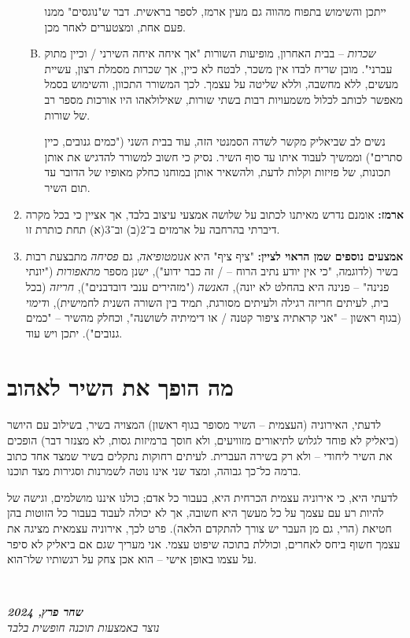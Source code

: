 \documentclass[]{article}
\newcommand\ndoc  {\dotfill \\ \vfil {\begin{center} {\textbf{\textit{שחר פרץ, 2024}} \\ \scriptsize \textit{נוצר באמצעות תוכנה חופשית בלבד}} \end{center}} \vfil	}
\begin{document}
\begin{enumerate}
\begin{enumerate}[A. ]
			ייתכן והשימוש בתפוח מהווה גם מעין ארמז, לספר בראשית. דבר ש"נוגסים" ממנו פעם אחת, ומצטערים לאחר מכן. 
			\item \textit{שכרות} – בבית האחרון, מופיעות השורות "אך איחה איחה השירני / וכיין מתוק עברני". מובן שריח לבדו אין משכר, לבטח לא כיין, אך שכרות מסמלת רצון, עשיית מעשים, ללא מחשבה, וללא שליטה על עצמך. לכך המשורר התכוון, והשימוש בסמל מאפשר לכותב לכלול משמעויות רבות בשתי שורות, שאילולאהו היו אורכות מספר רב של שורות. 
			
			נשים לב שביאליק מקשר לשדה הסמנטי הזה, עוד בבית השני ("כמים גנובים, כיין סתרים") וממשיך לעבוד איתו עד סוף השיר. נסיק כי חשוב למשורר להדגיש את אותן תכונות, של פזיזות וקלות לדעת, ולהשאיר אותן במוחנו כחלק מאופיו של הדובר עד תום השיר. 
		\end{enumerate}
		\item \textbf{ארמז: }אומנם נדרש מאיתנו לכתוב על שלושה אמצעי עיצוב בלבד, אך אציין כי בכל מקרה דיברתי בהרחבה על ארמזים ב־2(ב) וב־3(א) תחת כותרת זו. 
		\item \textbf{אמצעים נוספים שמן הראוי לציין: }"ציף ציף" היא \textit{אנומטופיאה}, גם \textit{פסיחה} מתבצעת רבות בשיר (לדוגמה, "כי אין יודע נתיב הרוח – / זה כבר ידוע"), ישנן מספר \textit{מתאפורות} ("יונתי פנינה" – פנינה היא בהחלט לא יונה), \textit{האנשה} ("מזהירים ענבי דובדבנים"), \textit{חריזה} (בכל בית, לעיתים חריזה רגילה ולעיתים מסורגת, תמיד בין השורה השנית לחמישית), ו\textit{דימוי} (בגוף ראשון – "אני קראתיה ציפור קטנה / או דימיתיה לשושנה", וכחלק מהשיר – "כמים גנובים").  יתכן ויש עוד. 
	\end{enumerate}
	\section*{מה הופך את השיר לאהוב}
	לדעתי, האירוניה (העצמית – השיר מסופר בגוף ראשון) המצויה בשיר, בשילוב עם היושר (ביאליק לא פוחד לגלוש לתיאורים מזוויעים, ולא חוסך ברמיזות גסות, לא מצנזר דבר) הופכים את השיר ליחודי – ולא רק בשירה העברית. לעיתים רחוקות נתקלים בשיר שמצד אחד כתוב ברמה כל־כך גבוהה, ומצד שני אינו נוטה לשמרנות וסגירות מצד תוכנו. 
	
	לדעתי היא, כי אירוניה עצמית הכרחית היא, בעבור כל אדם; כולנו איננו מושלמים, וגישה של להיות רע עם עצמך על כל מעשך היא חשובה, אך לא יכולה לעבוד בעבור כל הזוטות בהן חטיאת (הרי, גם מן העבר יש צורך להתקדם הלאה). פרט לכך, אירוניה עצמאית מציגה את עצמך חשוף ביחס לאחרים, וכוללת בתוכה שיפוט עצמי. אני מעריך שגם אם ביאליק לא סיפר על עצמו באופן אישי – הוא אכן צחק על רגשותיו שלו־הוא. 
	
	\ndoc
\end{document}
